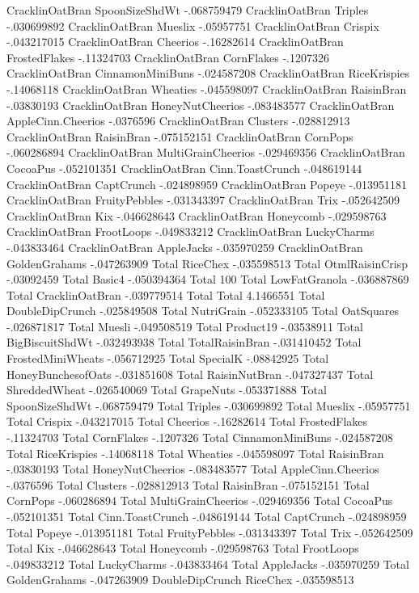 CracklinOatBran	SpoonSizeShdWt	-.068759479
CracklinOatBran	Triples	-.030699892
CracklinOatBran	Mueslix	-.05957751
CracklinOatBran	Crispix	-.043217015
CracklinOatBran	Cheerios	-.16282614
CracklinOatBran	FrostedFlakes	-.11324703
CracklinOatBran	CornFlakes	-.1207326
CracklinOatBran	CinnamonMiniBuns	-.024587208
CracklinOatBran	RiceKrispies	-.14068118
CracklinOatBran	Wheaties	-.045598097
CracklinOatBran	RaisinBran	-.03830193
CracklinOatBran	HoneyNutCheerios	-.083483577
CracklinOatBran	AppleCinn.Cheerios	-.0376596
CracklinOatBran	Clusters	-.028812913
CracklinOatBran	RaisinBran	-.075152151
CracklinOatBran	CornPops	-.060286894
CracklinOatBran	MultiGrainCheerios	-.029469356
CracklinOatBran	CocoaPus	-.052101351
CracklinOatBran	Cinn.ToastCrunch	-.048619144
CracklinOatBran	CaptCrunch	-.024898959
CracklinOatBran	Popeye	-.013951181
CracklinOatBran	FruityPebbles	-.031343397
CracklinOatBran	Trix	-.052642509
CracklinOatBran	Kix	-.046628643
CracklinOatBran	Honeycomb	-.029598763
CracklinOatBran	FrootLoops	-.049833212
CracklinOatBran	LuckyCharms	-.043833464
CracklinOatBran	AppleJacks	-.035970259
CracklinOatBran	GoldenGrahams	-.047263909
Total	RiceChex	-.035598513
Total	OtmlRaisinCrisp	-.03092459
Total	Basic4	-.050394364
Total	100%
Total	LowFatGranola	-.036887869
Total	CracklinOatBran	-.039779514
Total	Total	4.1466551
Total	DoubleDipCrunch	-.025849508
Total	NutriGrain	-.052333105
Total	OatSquares	-.026871817
Total	Muesli	-.049508519
Total	Product19	-.03538911
Total	BigBiscuitShdWt	-.032493938
Total	TotalRaisinBran	-.031410452
Total	FrostedMiniWheats	-.056712925
Total	SpecialK	-.08842925
Total	HoneyBunchesofOats	-.031851608
Total	RaisinNutBran	-.047327437
Total	ShreddedWheat	-.026540069
Total	GrapeNuts	-.053371888
Total	SpoonSizeShdWt	-.068759479
Total	Triples	-.030699892
Total	Mueslix	-.05957751
Total	Crispix	-.043217015
Total	Cheerios	-.16282614
Total	FrostedFlakes	-.11324703
Total	CornFlakes	-.1207326
Total	CinnamonMiniBuns	-.024587208
Total	RiceKrispies	-.14068118
Total	Wheaties	-.045598097
Total	RaisinBran	-.03830193
Total	HoneyNutCheerios	-.083483577
Total	AppleCinn.Cheerios	-.0376596
Total	Clusters	-.028812913
Total	RaisinBran	-.075152151
Total	CornPops	-.060286894
Total	MultiGrainCheerios	-.029469356
Total	CocoaPus	-.052101351
Total	Cinn.ToastCrunch	-.048619144
Total	CaptCrunch	-.024898959
Total	Popeye	-.013951181
Total	FruityPebbles	-.031343397
Total	Trix	-.052642509
Total	Kix	-.046628643
Total	Honeycomb	-.029598763
Total	FrootLoops	-.049833212
Total	LuckyCharms	-.043833464
Total	AppleJacks	-.035970259
Total	GoldenGrahams	-.047263909
DoubleDipCrunch	RiceChex	-.035598513
